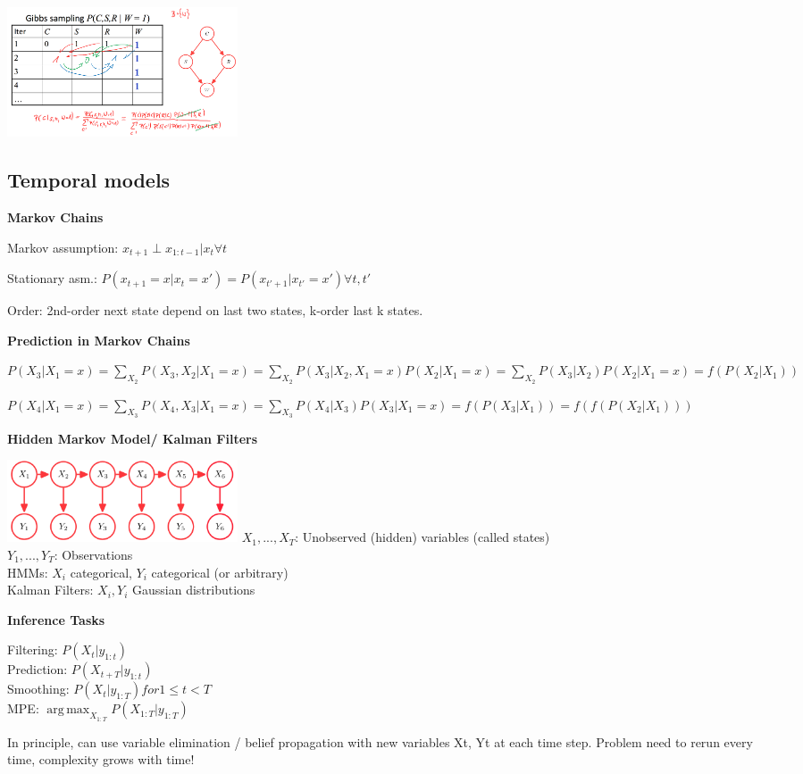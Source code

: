 \documentclass[a4paper, 11pt, landscape]{article}
\DeclareMathOperator*{\argmax}{arg\,max}
\begin{document}
\begin{multicols*}{3}
\includegraphics[width=0.3\textwidth]{img/pai3.png}

\subsection{Temporal models}

\textbf{Markov Chains}

Markov assumption: $x_{t+1} \perp x_{1:t-1} | x_t \forall t$

Stationary asm.: $P(x_{t+1} = x | x_t = x') = P(x_{t'+1} | x_{t'} = x') \forall t, t'$

Order: 2nd-order next state depend on last two states, k-order last k states. 

\textbf{Prediction in Markov Chains}

$P(X_3 | X_1 = x) = \sum_{X_2}P(X_3,X_2|X_1 = x) = \sum_{X_2}P(X_3 | X_2, X_1 = x)P(X_2 | X_1 = x) =  \sum_{X_2}P(X_3 | X_2)P(X_2 | X_1 = x) = f(P(X_2|X_1))$

$P(X_4 | X_1 = x) = \sum_{X_3}P(X_4,X_3|X_1 = x) = \sum_{X_3}P(X_4 | X_3)P(X_3 | X_1 = x) = f(P(X_3|X_1)) = f(f(P(X_2 | X_1)))$

\textbf{Hidden Markov Model/ Kalman Filters}

\includegraphics[width=0.3\textwidth]{img/pai4.png}
$X_1,...,X_T$: Unobserved (hidden) variables (called states) \\
$Y_1,...,Y_T$: Observations \\
HMMs: $X_i$ categorical, $Y_i$ categorical (or arbitrary)\\
Kalman Filters: $X_i, Y_i$ Gaussian distributions

\textbf{Inference Tasks}

Filtering: $P(X_t | y_{1:t} ) $\\
Prediction: $P(X_{t+T} | y_{1:t} )$ \\
Smoothing: $P(X_t | y_{1:T}) for 1\leq t < T$\\
MPE: $\argmax_{X_{1:T}} P(X_{1:T} | y_{1:T})$
 
In principle, can use variable elimination / belief propagation with new variables Xt, Yt at
each time step. Problem need to rerun every time, complexity grows with time!


\end{multicols*}
\end{document}
